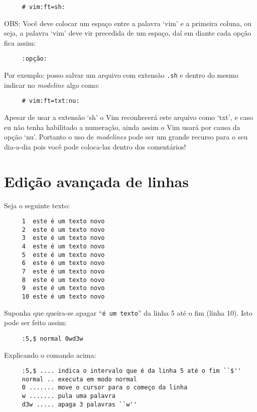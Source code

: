 \begin{verbatim}
     # vim:ft=sh:
\end{verbatim}

OBS: Você deve colocar um espaço entre a palavra `vim' e a primeira
coluna, ou seja, a palavra `vim' deve vir precedida de um espaço, daí
em diante cada opção fica assim:

\begin{verbatim}
     :opção:
\end{verbatim}

Por exemplo: posso salvar um arquivo com extensão \verb|.sh| e dentro do
mesmo indicar no {\em modeline} algo como:

\begin{verbatim}
     # vim:ft=txt:nu:
\end{verbatim}

Apesar de usar a extensão `sh' o Vim reconhecerá este arquivo como `txt', e
caso eu não tenha habilitado a numeração, ainda assim o Vim usará por causa da
opção `nu'.  Portanto o uso de {\em modelines} pode ser um grande recurso para o seu
dia-a-dia pois você pode coloca-las dentro dos comentários!

\section{Edição avançada de linhas}

Seja o seguinte texto:

\begin{verbatim}
     1  este é um texto novo
     2  este é um texto novo
     3  este é um texto novo
     4  este é um texto novo
     5  este é um texto novo
     6  este é um texto novo
     7  este é um texto novo
     8  este é um texto novo
     9  este é um texto novo
     10 este é um texto novo
\end{verbatim}

Suponha que queira-se apagar ``{\tt é um texto}'' da linha 5 até o fim (linha 10). Isto pode ser feito
assim:

\begin{verbatim}
     :5,$ normal 0wd3w
\end{verbatim}

Explicando o comando acima:

\begin{verbatim}
     :5,$ .... indica o intervalo que é da linha 5 até o fim ``$''
     normal .. executa em modo normal
     0 ....... move o cursor para o começo da linha
     w ....... pula uma palavra
     d3w ..... apaga 3 palavras ``w''
\end{verbatim}

